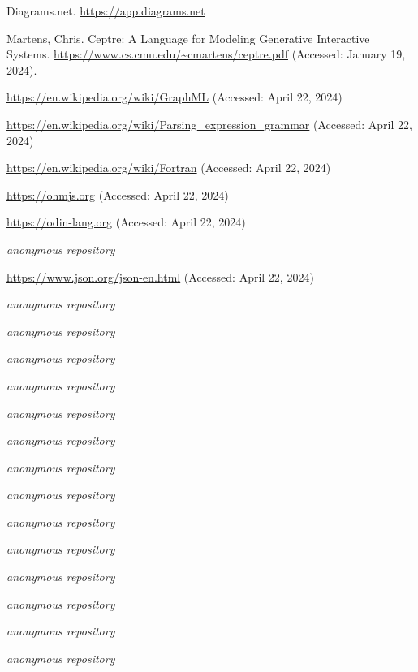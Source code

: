 \documentclass[10pt,anonymous,review]{acmart}
\begin{document}
\begin{thebibliography}{9}

Diagrams.net.
\url{https://app.diagrams.net}

Martens, Chris. Ceptre: A Language for Modeling Generative Interactive Systems. \url{https://www.cs.cmu.edu/~cmartens/ceptre.pdf} (Accessed: January 19, 2024).

\url{https://en.wikipedia.org/wiki/GraphML} (Accessed: April 22, 2024)

\url{https://en.wikipedia.org/wiki/Parsing_expression_grammar} (Accessed: April 22, 2024)

\url{https://en.wikipedia.org/wiki/Fortran} (Accessed: April 22, 2024)

\url{https://ohmjs.org} (Accessed: April 22, 2024)

\url{https://odin-lang.org} (Accessed: April 22, 2024)

\emph{anonymous repository}

\url{https://www.json.org/json-en.html} (Accessed: April 22, 2024)

\emph{anonymous repository}

\emph{anonymous repository}

\emph{anonymous repository}

\emph{anonymous repository}

\emph{anonymous repository}

\emph{anonymous repository}

\emph{anonymous repository}

\emph{anonymous repository}

\emph{anonymous repository}

\emph{anonymous repository}

\emph{anonymous repository}

\emph{anonymous repository}

\emph{anonymous repository}

\emph{anonymous repository}

\end{thebibliography}
\end{document}
